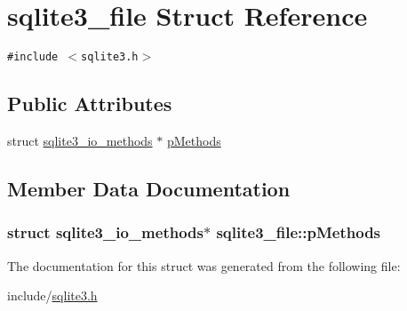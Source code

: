 \hypertarget{structsqlite3__file}{
\section{sqlite3\_\-file Struct Reference}
\label{structsqlite3__file}
}
{\tt \#include $<$sqlite3.h$>$}

\subsection*{Public Attributes}
\begin{CompactItemize}
\item 
struct \hyperlink{structsqlite3__io__methods}{sqlite3\_\-io\_\-methods} $\ast$ \hyperlink{structsqlite3__file_27d68d712557d860f3ee987cd84c7a10}{pMethods}
\end{CompactItemize}


\subsection{Member Data Documentation}
\hypertarget{structsqlite3__file_27d68d712557d860f3ee987cd84c7a10}{
\subsubsection[pMethods]{\setlength{\rightskip}{0pt plus 5cm}struct {\bf sqlite3\_\-io\_\-methods}$\ast$ {\bf sqlite3\_\-file::pMethods}}}
\label{structsqlite3__file_27d68d712557d860f3ee987cd84c7a10}




The documentation for this struct was generated from the following file:\begin{CompactItemize}
\item 
include/\hyperlink{sqlite3_8h}{sqlite3.h}\end{CompactItemize}
